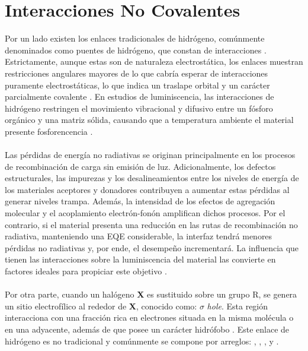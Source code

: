 \section{Interacciones No Covalentes}
Por un lado existen los enlaces tradicionales de hidrógeno, comúnmente denominados como puentes de hidrógeno, que constan de interacciones  \cite{haque2023non}. Estrictamente, aunque estas son de naturaleza electrostática, los enlaces muestran restricciones angulares mayores de lo que cabría esperar de interacciones puramente electrostáticas, lo que indica un traslape orbital y un carácter parcialmente covalente \cite{herschlag2018hydrogen}. En estudios de luminiscencia, las interacciones de hidrógeno restringen el movimiento vibracional y difusivo  entre un fósforo orgánico y una matriz sólida, causando que a temperatura ambiente el material presente fosforencencia \cite{kwon2014tailoring}. \\ \\ 
Las pérdidas de energía no radiativas se originan principalmente en los procesos de recombinación de carga sin emisión de luz. Adicionalmente, los defectos estructurales, las impurezas y los desalineamientos entre los niveles de energía de los materiales aceptores y donadores contribuyen a aumentar estas pérdidas al generar niveles trampa. Además, la intensidad de los efectos de agregación molecular y el acoplamiento electrón-fonón amplifican dichos procesos. Por el contrario, si el material presenta una reducción en las rutas de recombinación no radiativa,  manteniendo una EQE considerable, la interfaz tendrá menores pérdidas no radiativas y, por ende, el desempeño incrementará. La influencia que tienen las interacciones sobre la luminiscencia del material las convierte en factores ideales para propiciar este objetivo \cite{wei2025reducing}. \\ \\
Por otra parte, cuando un halógeno \textbf{X} es sustituido sobre un grupo R, se genera un sitio electrofílico al rededor de \textbf{X}, conocido como: $\sigma$ \textit{hole}. Esta región interacciona con una fracción rica en electrones situada en la misma molécula o en una adyacente, además de que posee un carácter hidrófobo \cite{kwon2014tailoring}. Este enlace de hidrógeno es no tradicional y comúnmente se compone por  arreglos: , , ,  y .




